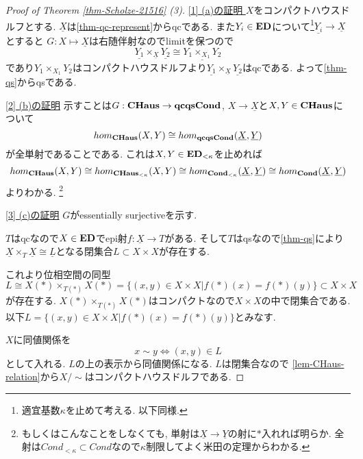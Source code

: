 \documentclass[dvipdfmx,a4paper,11pt]{article}
\theoremstyle{definition}
\begin{document}
\begin{proof}[Proof of Theorem \ref{thm-Scholze-21516} (3)]

\underline{[1] (a)の証明 }
$X$をコンパクトハウスドルフとする.
$\underline{X}$は\ref{thm-qc-represent}からqcである.
また$Y_i \in {\bf ED}$について\footnote{適宜基数$\kappa$を止めて考える. 以下同様.}$\underline{Y_i} \to \underline{X}$とすると
$G : X \mapsto \underline{X}$は右随伴射なのでlimitを保つので
$$
\underline{Y_1} \times_{\underline{X}}\underline{Y_2}
\cong  
\underline{Y_1 \times_{X_1}Y_2}
$$
であり$Y_1 \times_{X_1}Y_2$はコンパクトハウスドルフより$\underline{Y_1} \times_{\underline{X}}\underline{Y_2}$はqcである. よって\ref{thm-qs}からqsである.

\underline{[2] (b)の証明}
示すことは$G : {\bf CHaus} \to {\bf qcqsCond}$, $X \to \underline{X}$と$X,Y \in {\bf CHaus}$について
$$
hom_{\bf CHaus} (X,Y) \cong 
hom_{\bf qcqsCond}(\underline{X}, \underline{Y})
$$
が全単射であることである.
これは$X,Y \in {\bf ED}_{< \kappa}$を止めれば
$$
hom_{\bf CHaus} (X,Y) \cong 
hom_{\bf CHaus_{< \kappa}} (X,Y) \cong
hom_{\bf Cond_{< \kappa}}(\underline{X}, \underline{Y})
\cong hom_{\bf Cond}(\underline{X}, \underline{Y})
$$
よりわかる. \footnote{もしくはこんなことをしなくても, 単射は$\underline{X} \to \underline{Y}$の射に$\ast$入れれば明らか. 全射は$Cond_{< \kappa} \subset Cond$なので$\kappa$制限してよく米田の定理からわかる.}

\underline{[3] (c)の証明}
$G$がessentially surjectiveを示す. 

$T$はqcなので$X \in {\bf ED}$でepi射$f : \underline{X} \to T$がある. %
そして$T$はqsなので\ref{thm-qs}により
$\underline{X} \times_{T} \underline{X} \cong \underline{L}$となる閉集合$L \subset X \times X$が存在する. 

これより位相空間の同型
$$
L \cong  X(\ast) \times_{T(\ast)} X(\ast)=  \{ (x,y) \in X \times X | f(\ast)(x) = f(\ast)(y)\} \subset X \times X
$$ 
が存在する. $X(\ast) \times_{T(\ast)} X(\ast)$はコンパクトなので$X \times X$の中で閉集合である. 
以下$L=\{ (x,y) \in X \times X | f(\ast)(x) = f(\ast)(y)\}$とみなす. 

$X$に同値関係を
$$
x \sim y \Leftrightarrow (x,y) \in L
$$
として入れる. $L$の上の表示から同値関係になる. 
$L$は閉集合なので
\ref{lem-CHaus-relation}から$X / \sim $はコンパクトハウスドルフである.


\end{proof}
\end{document}
